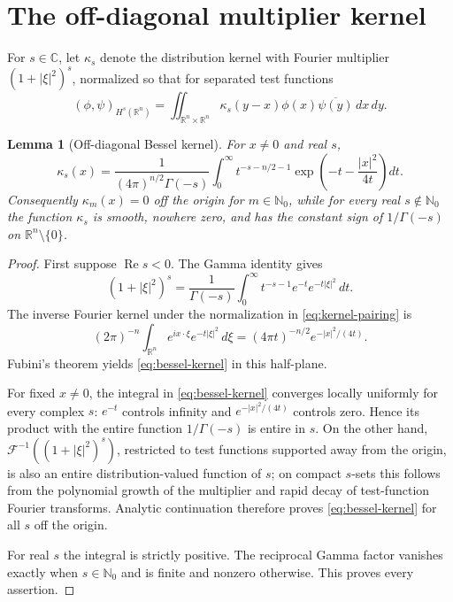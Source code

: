 \documentclass[10pt,a4paper]{article}
\newtheorem{lemma}[theorem]{Lemma}
\newcommand{\R}{\mathbb R}
\newcommand{\N}{\mathbb N}
\newcommand{\F}{\mathcal F}
\begin{document}
\section{The off-diagonal multiplier kernel}

For $s\in\mathbb C$, let $\kappa_s$ denote the distribution kernel with
Fourier multiplier $(1+|\xi|^2)^s$, normalized so that for separated test
functions
\[
 (\phi,\psi)_{H^s(\R^n)}
 =\iint_{\R^n\times\R^n}
   \kappa_s(y-x)\phi(x)\overline{\psi(y)}\,dx\,dy.
 \tag{3}\label{eq:kernel-pairing}
\]

\begin{lemma}[Off-diagonal Bessel kernel]\label{lem:kernel}
For $x\ne0$ and real $s$,
\[
 \kappa_s(x)
 =\frac{1}{(4\pi)^{n/2}\Gamma(-s)}
   \int_0^\infty
   t^{-s-n/2-1}\exp\!\left(-t-\frac{|x|^2}{4t}\right)dt.
 \tag{4}\label{eq:bessel-kernel}
\]
Consequently $\kappa_m(x)=0$ off the origin for $m\in\N_0$, while for every
real $s\notin\N_0$ the function $\kappa_s$ is smooth, nowhere zero, and has
the constant sign of $1/\Gamma(-s)$ on $\R^n\setminus\{0\}$.
\end{lemma}

\begin{proof}
First suppose $\operatorname{Re}s<0$.  The Gamma identity gives
\[
 (1+|\xi|^2)^s
 =\frac1{\Gamma(-s)}\int_0^\infty
   t^{-s-1}e^{-t}e^{-t|\xi|^2}\,dt.
\]
The inverse Fourier kernel under the normalization in
\eqref{eq:kernel-pairing} is
\[
 (2\pi)^{-n}\int_{\R^n}e^{ix\cdot\xi}e^{-t|\xi|^2}\,d\xi
 =(4\pi t)^{-n/2}e^{-|x|^2/(4t)}.
\]
Fubini's theorem yields \eqref{eq:bessel-kernel} in this half-plane.

For fixed $x\ne0$, the integral in \eqref{eq:bessel-kernel} converges
locally uniformly for every complex $s$: $e^{-t}$ controls infinity and
$e^{-|x|^2/(4t)}$ controls zero.  Hence its product with the entire function
$1/\Gamma(-s)$ is entire in $s$.  On the other hand,
$\F^{-1}((1+|\xi|^2)^s)$, restricted to test functions supported away from
the origin, is also an entire distribution-valued function of $s$; on
compact $s$-sets this follows from the polynomial growth of the multiplier
and rapid decay of test-function Fourier transforms.  Analytic continuation
therefore proves \eqref{eq:bessel-kernel} for all $s$ off the origin.

For real $s$ the integral is strictly positive.  The reciprocal Gamma
factor vanishes exactly when $s\in\N_0$ and is finite and nonzero otherwise.
This proves every assertion.
\end{proof}
\end{document}
